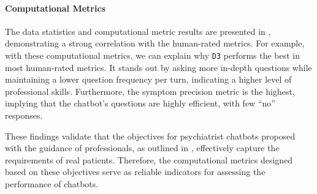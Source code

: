 \paragraph{Computational Metrics}
The data statistics and computational metric results are presented in , demonstrating a strong correlation with the human-rated metrics. 
For example, with these computational metrics, we can explain why \texttt{D3} performs the best in most human-rated metrics. It stands out by asking more in-depth questions while maintaining a lower question frequency per turn, indicating a higher level of professional skills. Furthermore, the symptom precision metric is the highest, implying that the chatbot's questions are highly efficient, with few ``no'' responses.  

These findings validate that the objectives for psychiatrist chatbots proposed with the guidance of professionals, as outlined in , effectively capture the requirements of real patients. Therefore, the computational metrics designed based on these objectives serve as reliable indicators for assessing the performance of chatbots.

\begin{table}[th]
    \small
    \centering
    \caption{Results of Computational Metrics for Psychiatrist Chatbots}
    \label{tab:auto_doc}
\end{table}

